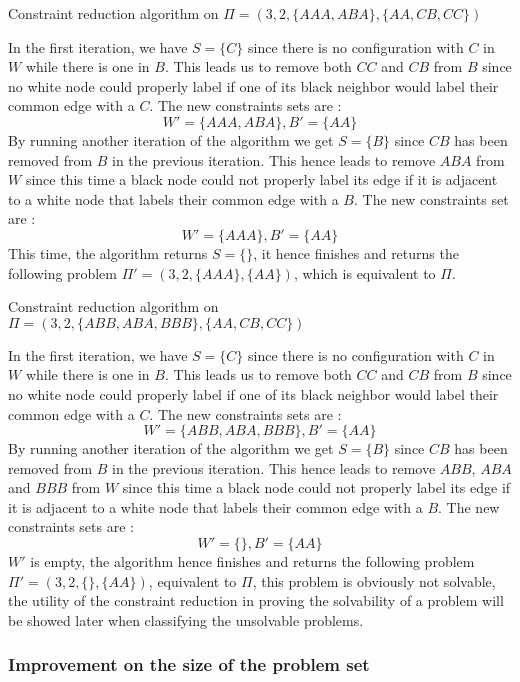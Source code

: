 \begin{exmp} Constraint reduction algorithm on $\Pi = (3, 2, \{AAA, ABA\}, \{AA, CB, CC\})$

In the first iteration, we have $S = \{C\}$ since there is no configuration with $C$ in $W$ while there is one in $B$.
This leads us to remove both $CC$ and $CB$ from $B$ since no white node could properly label if one of its black neighbor would label their common edge with a $C$.
The new constraints sets are :
$$W' = \{AAA, ABA\}, B' = \{AA\}$$
By running another iteration of the algorithm we get $S = \{B\}$ since $CB$ has been removed from $B$ in the previous iteration.
This hence leads to remove $ABA$ from $W$ since this time a black node could not properly label its edge if it is adjacent to a white node that labels their common edge with a $B$.
The new constraints set are :
$$W' = \{AAA\}, B' = \{AA\}$$
This time, the algorithm returns $S = \{\}$, it hence finishes and returns the following problem $\Pi' = (3, 2, \{AAA\}, \{AA\})$, which is equivalent to $\Pi$.
\end{exmp}

\begin{exmp} Constraint reduction algorithm on $\Pi = (3, 2, \{ABB, ABA, BBB\}, \{AA, CB, CC\})$

In the first iteration, we have $S = \{C\}$ since there is no configuration with $C$ in $W$ while there is one in $B$.
This leads us to remove both $CC$ and $CB$ from $B$ since no white node could properly label if one of its black neighbor would label their common edge with a $C$.
The new constraints sets are :
$$W' = \{ABB, ABA, BBB\}, B' = \{AA\}$$
By running another iteration of the algorithm we get $S = \{B\}$ since $CB$ has been removed from $B$ in the previous iteration.
This hence leads to remove $ABB$, $ABA$ and $BBB$ from $W$ since this time a black node could not properly label its edge if it is adjacent to a white node that labels their common edge with a $B$.
The new constraints sets are :
$$W' = \{\}, B' = \{AA\}$$
$W'$ is empty, the algorithm hence finishes and returns the following problem $\Pi' = (3, 2,\{\}, \{AA\})$, equivalent to $\Pi$, this problem is obviously not solvable, the utility of the constraint reduction in proving the solvability of a problem will be showed later when classifying the unsolvable problems.
\end{exmp}
\subsubsection{Improvement on the size of the problem set}


